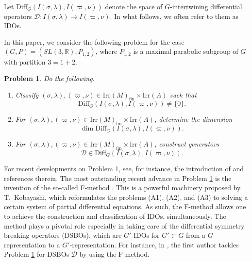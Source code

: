 \documentclass[reqno,11pt]{amsart}
\newtheorem{prob}[equation]{Problem}
\theoremstyle{remark}
\numberwithin{equation}{section}
\newcommand{\R}{\mathbb{R}}
\newcommand{\Cal}{\mathcal}
\newcommand{\Diff}{\mathrm{Diff}}
\newcommand{\Irr}{\mathrm{Irr}}
\newcommand{\fin}{\mathrm{fin}}
\newcommand{\D}{\Cal{D}}
\begin{document}
Let $\Diff_G(I(\sigma,\lambda), I(\varpi,\nu))$ denote the space of $G$-intertwining
differential operators $\D \colon I(\sigma,\lambda) \to I(\varpi,\nu)$. In what follows,
we often refer to them as IDOs.

In this paper, we consider the following problem for the case
$(G, P)=(SL(3,\R), P_{1,2})$, where $P_{1,2}$ is a maximal parabolic subgroup 
of $G$ with partition $3=1+2$.

 \begin{prob}\label{prob:A}
Do the following.
\begin{enumerate}
\item[\emph{(A1)}] Classify $(\sigma, \lambda), (\varpi, \nu) \in \Irr(M)_\fin\times \Irr(A)$ 
such that
\begin{equation*}
\Diff_G(I(\sigma,\lambda), I(\varpi,\nu))\neq\{0\}.
\end{equation*}

\item[\emph{(A2)}] 
For $(\sigma, \lambda), (\varpi, \nu) \in \Irr(M)_\fin\times \Irr(A)$,
determine the dimension 
\begin{equation*}
\dim \Diff_G(I(\sigma,\lambda), I(\varpi,\nu)).
\end{equation*}

\item[\emph{(A3)}] 
For $(\sigma, \lambda), (\varpi, \nu) \in \Irr(M)_\fin\times \Irr(A)$,
construct generators 
\begin{equation*}
\D \in \Diff_G(I(\sigma,\lambda), I(\varpi,\nu)).
\end{equation*}
\end{enumerate}
\end{prob}

For recent developments on Problem \ref{prob:A}, see, for instance,
the introduction of \cite{KuOr25a} and references therein. 
The most outstanding recent advance in Problem \ref{prob:A} is the invention 
of the so-called F-method \cite{KP1, KP2}. 
This is a powerful machinery proposed by T.\ Kobayashi,
which reformulates the problems (A1), (A2), and (A3) to solving a certain system
of partial differential equations. As such, the F-method allows one to 
achieve the construction and classification of IDOs, simultaneously. 
The method plays a pivotal role especially in taking care of the differential symmetry breaking operators (DSBOs), 
which are $G'$-IDOs for $G' \subset G$ from a $G$-representation
to a $G'$-representation. For instance, in \cite{Kubo24+}, the first author tackles Problem \ref{prob:A} for DSBOs $\D$  by using the F-method.
\end{document}
